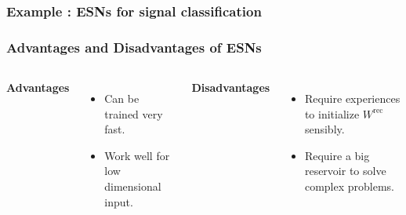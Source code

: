 \documentclass[Nike]{tuberlinbeamer}
\begin{document}
\begin{frame}
	\frametitle{Example : ESNs for signal classification}
		    

\end{frame}

\begin{frame}
	\frametitle{Advantages and Disadvantages of ESNs}
	\begin{columns}
		\textbf{Advantages}
					 \begin{itemize}
					 	\item Can be trained very fast.
					 	\item Work well for low dimensional input.
					 \end{itemize}

					 \textbf{Disadvantages}
				 \begin{itemize}
				 	\item Require experiences to initialize $W^{\text{rec}}$ sensibly.
				 	\item Require a big reservoir to solve complex problems.
				 \end{itemize}	

	\end{columns}				
\end{frame}
\end{document}
